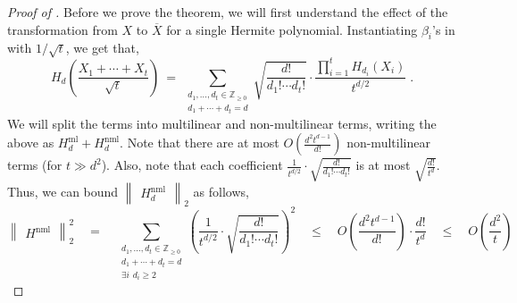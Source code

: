 \documentclass[11pt]{article}
\newcommand{\inbrace}[1]{\left \{ #1 \right \}}
\newcommand{\inparen}[1]{\left ( #1 \right )}
\newcommand{\norm}[2]{\begin{Vmatrix} #2 \end{Vmatrix}_{#1}}
\newcommand{\set}[1]{\inbrace{#1}}
\newcommand{\bit}{\set{0,1}}
\newcommand{\bbZ}{{\mathbb Z}}
\newcommand{\ml}{\mathrm{ml}}
\newcommand{\nml}{\mathrm{nml}}
\begin{document}
\begin{proof}[Proof of ]
	Before we prove the theorem, we will first understand the effect of the transformation from $X$ to $\overline{X}$ for a single Hermite polynomial. Instantiating $\beta_i$'s in  with $1/\sqrt{t}$, we get that,
	\[ H_d\inparen{\frac{X_1 + \cdots + X_t}{\sqrt{t}}} \ = \ \sum_{\substack{d_1, \ldots, d_t \in \bbZ_{\ge 0} \\ d_1 + \cdots + d_t = d}} \sqrt{\frac{d!}{d_1! \cdots d_t!}} \cdot \frac{\prod_{i=1}^{t} H_{d_i}(X_i)}{t^{d/2}}\;.\]
	We will split the terms into multilinear and non-multilinear terms, writing the above as $H_d^{\ml} + H_d^{\nml}$. Note that there are at most $O(\frac{d^2 t^{d-1}}{d!})$ non-multilinear terms (for $t \gg d^2$). Also, note that each coefficient $\frac{1}{t^{d/2}} \cdot \sqrt{\frac{d!}{d_1! \cdots d_t!}}$ is at most $\sqrt{\frac{d!}{t^d}}$. Thus, we can bound $\norm{2}{H_d^{\nml}}$ as follows,
	\begin{equation}
	\norm{2}{H^{\nml}}^2 \quad = \quad \sum_{\substack{d_1, \ldots, d_t \in \bbZ_{\ge 0} \\ d_1 + \cdots + d_t = d \\ \exists i\,\ d_i \ge 2}} \inparen{\frac{1}{t^{d/2}} \cdot \sqrt{\frac{d!}{d_1! \cdots d_t!}}}^2 \quad \le \quad O\inparen{\frac{d^2 t^{d-1}}{d!}} \cdot \frac{d!}{t^d} \quad \le \quad O\inparen{\frac{d^2}{t}} \label{eqn:nml_small}
	\end{equation}
	

\end{proof}
\end{document}
